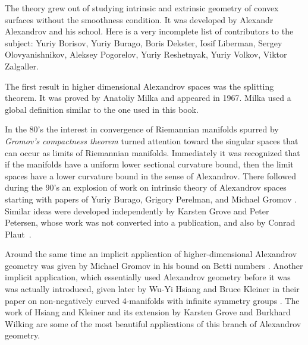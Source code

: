 The theory grew out of studying intrinsic and extrinsic geometry of convex surfaces without the smoothness condition.
It was developed by Alexandr Alexandrov
and his school.
Here is a very incomplete list of contributors to the subject:
Yuriy  Borisov,
Yuriy  Burago,
Boris Dekster,
Iosif  Liberman,
Sergey  Olovyanishnikov,
Aleksey  Pogorelov,
Yuriy  Reshetnyak,
Yuriy  Volkov,
Viktor  Zalgaller.

The first result in higher dimensional Alexandrov spaces was the splitting theorem.
It was proved by Anatoliy Milka \cite{milka-line} and appeared in 1967.
Milka used a global definition similar to the one used in this book. %

{\sloppy 

In the 80's the interest in convergence of Riemannian manifolds spurred by \emph{Gromov's compactness theorem} \cite{gromov-MS} turned attention toward the singular spaces that can occur as limits of Riemannian manifolds.
Immediately it was recognized that if the manifolds have a uniform lower sectional curvature bound, then the limit spaces have a lower curvature bound in the sense of Alexandrov.
There followed during the 90's an explosion of work on intrinsic theory of Alexandrov spaces  starting with papers of Yuriy Burago, Grigory Perelman, and Michael Gromov  \cite{burago-gromov-perelman,perelman:spaces2}.
Similar ideas were developed independently by Karsten Grove
and Peter Petersen, whose work was not converted into a publication, and also by
Conrad Plaut~\cite{plaut-preprint}.

}

Around the same time an implicit application of higher-dimensional Alexandrov geometry was given by Michael Gromov in his bound on Betti numbers \cite{gromov:betti}.
Another implicit application, which essentially used Alexandrov geometry before it was was actually introduced, given later by Wu-Yi Hsiang and Bruce Kleiner in their paper on non-negatively curved 4-manifolds with infinite symmetry groups \cite{hsiang-kleiner}.
The work of Hsiang and Kleiner and its extension by Karsten Grove and Burkhard Wilking \cite{grove-wilking} are some of the most beautiful applications of this branch of Alexandrov geometry.

